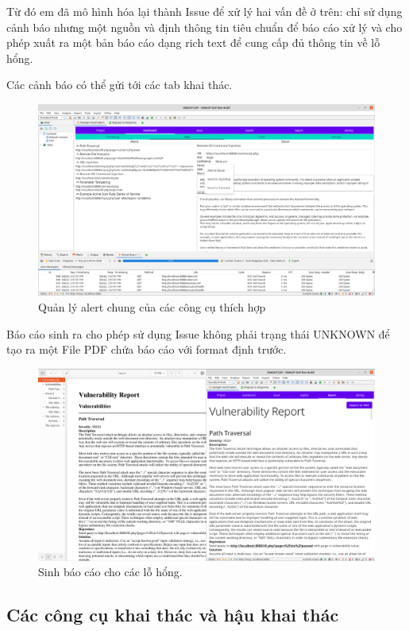 \documentclass[./../main.tex]{subfiles}
\begin{document}
Từ đó em đã mô hình hóa lại thành Issue để xử lý hai vấn đề ở trên:
chỉ sử dụng cảnh báo nhưng một nguồn và định thông tin tiêu chuẩn để
báo cáo xử lý và cho phép xuất ra một bản báo cáo dạng rich text để cung
cấp đủ thông tin về lỗ hổng.

Các cảnh báo có thể gửi tới các tab khai thác.

\begin{figure}[H]
	\includegraphics[width=\linewidth]{./images/alert.png}
	\caption{Quản lý alert chung của các công cụ thích hợp}
	\label{fig:alert}
\end{figure}

Báo cáo sinh ra cho phép sử dụng Issue không phải trạng thái
UNKNOWN để tạo ra một File PDF chứa báo cáo với format định trước.

\begin{figure}[H]
	\includegraphics[width=\linewidth]{./images/report.png}
	\caption{Sinh báo cáo cho các lỗ hổng.}
	\label{fig:report}
\end{figure}

\subsection{Các công cụ khai thác và hậu khai thác}
\end{document}
